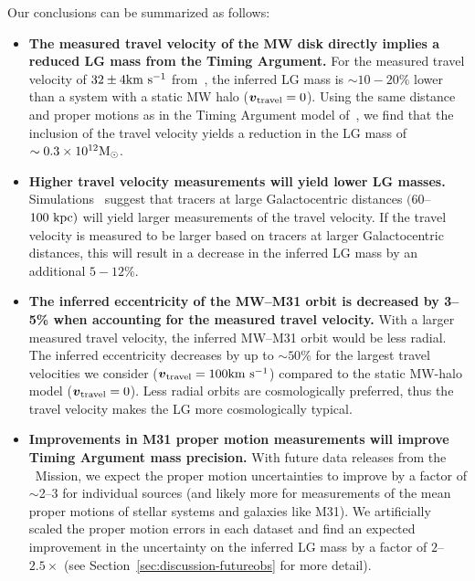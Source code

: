 \documentclass[twocolumn]{aastex631}
\newcommand{\bov}{\ensuremath{\boldsymbol{v}}}
\newcommand{\vtrav}{\ensuremath{\bov_{\rm travel}}}
\begin{document}
Our conclusions can be summarized as follows:
\begin{itemize}
  \item \textbf{The measured travel velocity of the MW disk directly implies
  a reduced LG mass from the Timing Argument.}
  For the measured travel velocity of $32\pm4 \mathrm{km}~\mathrm{s}^{-1}$ from~\cite{Petersen2021},
  the inferred LG mass is $\sim10-20\%$ lower than a system with a static MW
  halo ($\vtrav=0$).
  Using the same distance and proper motions as in the Timing Argument model
  of~\cite{vdm2012}, we find that the inclusion of the travel velocity yields
  a reduction in the LG mass of $\sim0.3\times 10^{12}\mathrm{M}_\odot$.
  \item \textbf{Higher travel velocity measurements will yield lower LG masses.}
  Simulations~\citep{Garavito-Camargo2021b} suggest that tracers at large
  Galactocentric distances $(60$--$100~\mathrm{kpc})$ will yield larger measurements of
  the travel velocity.
  If the travel velocity is measured to be larger based on tracers at larger
  Galactocentric distances, this will result in a decrease in the inferred LG
  mass by an additional $5-12\%$.
  \item \textbf{The inferred eccentricity of the MW--M31 orbit is decreased by
  3--5\% when accounting for the measured travel velocity.}
  With a larger measured travel velocity, the inferred MW--M31 orbit would be
  less radial.
  The inferred eccentricity decreases by up to $\sim50\%$ for the largest travel
  velocities we consider ($\vtrav=100\kms$) compared to the static MW-halo model
  ($\vtrav=0$).
  Less radial orbits are cosmologically preferred, thus the travel velocity
  makes the LG more cosmologically typical.
  \item \textbf{Improvements in M31 proper motion measurements will improve
  Timing Argument mass precision.}
  With future data releases from the \gaia\ Mission, we expect the proper motion
  uncertainties to improve by a factor of $\sim$2--3 for individual sources (and
  likely more for measurements of the mean proper motions of stellar systems
  and galaxies like M31).
  We artificially scaled the proper motion errors in each dataset and find an
  expected improvement in the uncertainty on the inferred LG mass by a factor of
  $2$--$2.5\times$ (see Section~\ref{sec:discussion-futureobs} for more detail).
\end{itemize}
\end{document}
